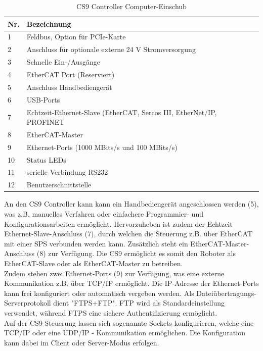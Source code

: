 \documentclass[ a4paper,
                oneside,
                toc=bibliography,
                toc=listof
                ]{scrbook}
\begin{document}
   	\begin{longtable}{|p{1cm}|p{12cm}|}
   		\caption{CS9 Controller Computer-Einschub}
   		\label{table:ComputerEinschub}\\
   		\hline
   		Nr. & Bezeichnung  \\ [0.5ex] 
   		\hline
   		\endhead
   		1 & Feldbus, Option für PCIe-Karte  \\ 
   		2 & Anschluss für optionale externe 24 V Stromversorgung  \\
   		3 & Schnelle Ein-/Ausgänge  \\
   		4 & EtherCAT Port (Reserviert) \\
   		5 & Anschluss Handbediengerät  \\
   		6 & USB-Ports \\  
   		7 & Echtzeit-Ethernet-Slave (EtherCAT, Sercos III, EtherNet/IP, PROFINET  \\ 
   		8 & EtherCAT-Master  \\ 
   		9 & Ethernet-Ports (1000 MBits/s und 100 MBits/s)  \\
   		10 & Status LEDs  \\ 
   		11 & serielle Verbindung RS232  \\
   		12 & Benutzerschnittstelle  \\  
   		\hline
   	\end{longtable}
   	 An den CS9 Controller kann kann ein Handbediengerät angeschlossen werden (5), was z.B.  manuelles Verfahren oder einfachere Programmier- und Konfigurationsarbeiten ermöglicht. Hervorzuheben ist zudem der Echtzeit-Ethernet-Slave-Anschluss (7), durch welchen die Steuerung z.B. über EtherCAT mit einer SPS verbunden werden kann. Zusätzlich steht ein EtherCAT-Master-Anschluss (8) zur Verfügung. Die CS9 ermöglicht es somit den Roboter als EtherCAT-Slave oder als EtherCAT-Master zu betreiben.\\
   	 Zudem stehen zwei Ethernet-Ports (9) zur Verfügung, was eine externe Kommunikation z.B. über TCP/IP ermöglicht. Die IP-Adresse der Ethernet-Ports kann frei konfiguriert oder automatisch vergeben werden. Als Dateiübertragungs-Serverprotokoll dient "FTPS+FTP". FTP wird als Standardeinstellung verwendet, während FTPS eine sichere Authentifizierung ermöglicht. \\
   	 Auf der CS9-Steuerung lassen sich sogenannte Sockets konfigurieren, welche eine TCP/IP oder eine UDP/IP - Kommunikation ermöglichen. Die Konfiguration kann dabei im Client oder Server-Modus erfolgen. \cite{CS9}
   	 
\end{document}
